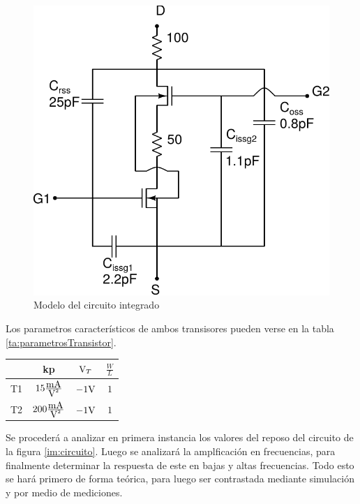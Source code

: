 \begin{figure}[ht]
	\centering 
	\includegraphics[scale=0.7]{../img/integrados.pdf}
	\caption{Modelo del circuito integrado}
	\label{im:modeloIntegrado}
\end{figure}

Los parametros característicos de ambos transisores pueden verse en la tabla \ref{ta:parametrosTransistor}.

\begin{table}[ht]
\begin{center}
\begin{tabular}{|c|c|c|c|}
\hline 
 & kp & $\mbox{V}_T$ & $\frac{W}{L}$ \\ 
\hline 
T1 & $15\frac{\mbox{mA}}{\mbox{V}^2}$ & $-1\mbox{V}$ & $1$ \\ 
\hline
T2 &  $200\frac{\mbox{mA}}{\mbox{V}^2}$  & $-1\mbox{V}$ & $1$\\
\hline
\end{tabular} 
\end{center}
\end{table}

Se procederá a analizar en primera instancia los valores del reposo del circuito de la figura \ref{im:circuito}. Luego se analizará la amplficación en frecuencias, para finalmente determinar la respuesta de este en bajas y altas frecuencias. Todo esto se hará primero de forma teórica, para luego ser contrastada mediante simulación y por medio de mediciones.